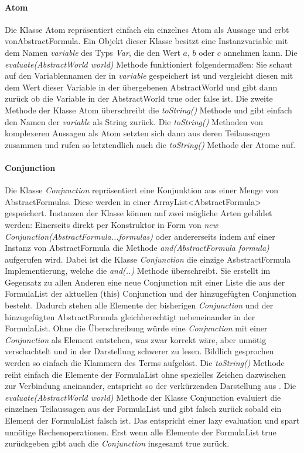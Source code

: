 \documentclass[12pt,a4paper]{article}
\begin{document}
\paragraph{Atom}


Die Klasse Atom repräsentiert einfach ein einzelnes Atom als Aussage und erbt vonAbstractFormula. Ein Objekt dieser Klasse besitzt eine Instanzvariable mit dem Namen \textit{variable} des Typs \textit{Var}, die den Wert $a$, $b$ oder $c$ annehmen kann. Die \textit{evaluate(AbstractWorld world)} Methode funktioniert folgendermaßen: Sie schaut auf den Variablennamen der in \textit{variable} gespeichert ist und vergleicht diesen mit dem Wert dieser Variable in der übergebenen AbstractWorld und gibt dann zurück ob die Variable in der AbstractWorld true oder false ist. Die zweite Methode der Klasse Atom überschreibt die \textit{toString()} Methode und gibt einfach den Namen der \textit{variable} als String zurück. Die \textit{toString()} Methoden von komplexeren Aussagen als Atom setzten sich dann aus deren Teilaussagen zusammen und rufen so letztendlich auch die \textit{toString()} Methode der Atome auf.


\paragraph{Conjunction}
Die Klasse \textit{Conjunction} repräsentiert eine Konjunktion aus einer Menge von AbstractFormulas. Diese werden in einer ArrayList<AbstractFormula> gespeichert. Instanzen der Klasse können auf zwei mögliche Arten gebildet werden: Einerseits direkt per Konstruktor in Form von \textit{new Conjunction(AbstractFormula...formulas)} oder andererseits indem auf einer Instanz von AbstractFormula die Methode \textit{and(AbstractFormula formula)} aufgerufen wird. Dabei ist die Klasse \textit{Conjunction} die einzige AsbstractFormula Implementierung, welche die \textit{and(..)} Methode überschreibt. Sie erstellt im Gegensatz zu allen Anderen eine neue Conjunction mit einer Liste die aus der FormulaList der aktuellen (this) Conjunction und der hinzugefügten Conjunction besteht. Dadurch stehen alle Elemente der bisherigen \textit{Conjunction} und der hinzugefügten AbstractFormula gleichberechtigt nebeneinander in der FormulaList. Ohne die Überschreibung würde eine \textit{Conjunction} mit einer \textit{Conjunction} als Element entstehen, was zwar korrekt wäre, aber unnötig verschachtelt und in der Darstellung schwerer zu lesen. Bildlich gesprochen werden so einfach die Klammern des Terms aufgelöst. Die \textit{toString()} Methode reiht einfach die Elemente der FormulaList ohne spezielles Zeichen dazwischen zur Verbindung aneinander, entspricht so der verkürzenden Darstellung aus \cite{beierle19}. Die \textit{evaluate(AbstractWorld world)} Methode der Klasse Conjunction evaluiert die einzelnen Teilaussagen aus der FormulaList und gibt falsch zurück sobald ein Element der FormulaList falsch ist. Das entspricht einer lazy evaluation und spart unnötige Rechenoperationen. Erst wenn alle Elemente der FormulaList true zurückgeben gibt auch die \textit{Conjunction} insgesamt true zurück.
\end{document}
